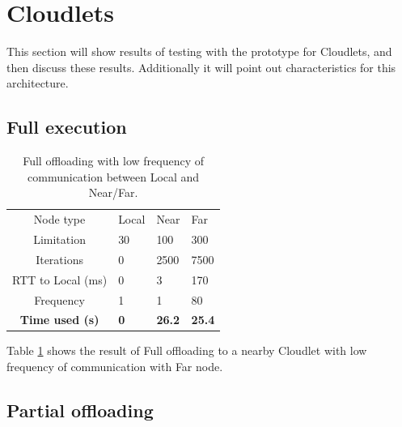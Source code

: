 

\section{Cloudlets}

This section will show results of testing with the prototype for Cloudlets, and then discuss these results. Additionally it will point out characteristics for this architecture.


\subsection{Full execution}


\begin{table}[h!]
    \centering
    \begin{tabular}[c]{c|p{2cm}p{2cm}p{2cm}}

        Node type & Local & Near & Far \\

        Limitation          & 30 & 100 & 300  \\

        Iterations          & 0 & 2500 & 7500  \\

        RTT to Local (ms)   & 0 & 3 & 170 \\

        Frequency           & 1 & 1 & 80 \\

        \hline
        \textbf{Time used (s)}       & \textbf{0} & \textbf{26.2} & \textbf{25.4} \\

    \end{tabular}
    \caption{Full offloading with low frequency of communication between Local and Near/Far.}
    \label{tab:Cloudlet_full_offloading_low_frequency}
\end{table}

Table \ref{tab:Cloudlet_full_offloading_low_frequency} shows the result of Full offloading to a nearby Cloudlet with low frequency of communication with Far node.







\subsection{Partial offloading}



